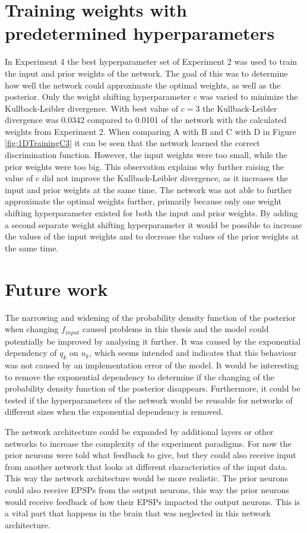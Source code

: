 \section{Training weights with predetermined hyperparameters}
In Experiment 4 the best hyperparameter set of Experiment 2 was used to train the input and prior weights of the network. The goal of this was to determine how well the network could approximate the optimal weights, as well as the posterior. Only the weight shifting hyperparameter c was varied to minimize the Kullback-Leibler divergence. With best value of $c = 3$ the Kullback-Leibler divergence was 0.0342 compared to 0.0101 of the network with the calculated weights from Experiment 2. When comparing A with B and C with D in Figure \ref{fig:1DTrainingC3} it can be seen that the network learned the correct discrimination function. However, the input weights were too small, while the prior weights were too big. This observation explains why further raising the value of c did not improve the Kullback-Leibler divergence, as it increases the input and prior weights at the same time. The network was not able to further approximate the optimal weights further, primarily because only one weight shifting hyperparameter existed for both the input and prior weights. By adding a second separate weight shifting hyperparameter it would be possible to increase the values of the input weights and to decrease the values of the prior weights at the same time.

\section{Future work}
The narrowing and widening of the probability density function of the posterior when changing $f_{input}$ caused problems in this thesis and the model could potentially be improved by analysing it further. It was caused by the exponential dependency of $q_k$ on $u_k$, which seems intended and indicates that this behaviour was not caused by an implementation error of the model. It would be interesting to remove the exponential dependency to determine if the changing of the probability density function of the posterior disappears. Furthermore, it could be tested if the hyperparameters of the network would be reusable for networks of different sizes when the exponential dependency is removed.

The network architecture could be expanded by additional layers or other networks to increase the complexity of the experiment paradigms. For now the prior neurons were told what feedback to give, but they could also receive input from another network that looks at different characteristics of the input data. This way the network architecture would be more realistic. The prior neurons could also receive EPSPs from the output neurons, this way the prior neurons would receive feedback of how their EPSPs impacted the output neurons. This is a vital part that happens in the brain that was neglected in this network architecture.

